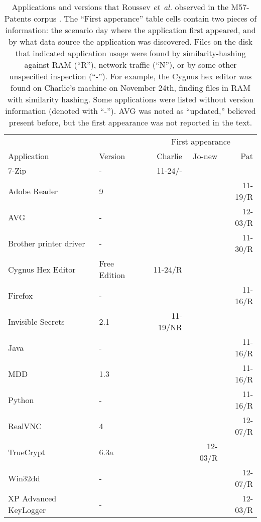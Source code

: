 \documentclass[11pt]{ucthesis}
\theoremstyle{plain}
\theoremstyle{definition}
\newcommand{\etal}{\emph{et~al.}\xspace}
\begin{document}
\begin{table}[htp]
\caption{\label{tbl:m57apps:roussev}Applications and versions that Roussev \etal observed in the M57-Patents corpus \cite[pages S67--S68]{roussev:dfrws12}.  The ``First apperance'' table cells contain two pieces of information: the scenario day where the application first appeared, and by what data source the application was discovered.  Files on the disk that indicated application usage were found by similarity-hashing against RAM (``R''), network traffic (``N''), or by some other unspecified inspection (``-'').  For example, the Cygnus hex editor was found on Charlie's machine on November 24th, finding files in RAM with similarity hashing.  Some applications were listed without version information (denoted with ``-'').  AVG was noted as ``updated,'' believed present before, but the first appearance was not reported in the text.}
\begin{center}
\begin{small}
\begin{tabular}{llrrr}
\toprule
 & & \multicolumn{3}{c}{First appearance} \\
Application & Version & Charlie & Jo-new & Pat \\
\midrule
7-Zip & - & 11-24/- & & \\
Adobe Reader & 9 & & & 11-19/R \\
AVG & - & & & 12-03/R \\
Brother printer driver & - & & & 11-30/R \\
Cygnus Hex Editor & Free Edition & 11-24/R & & \\
Firefox & - & & & 11-16/R \\
Invisible Secrets & 2.1 & 11-19/NR & & \\
Java & - & & & 11-16/R \\
MDD & 1.3 & & & 11-16/R \\
Python & - & & & 11-16/R \\
RealVNC & 4 & & & 12-07/R \\
TrueCrypt & 6.3a & & 12-03/R & \\
Win32dd & - & & & 12-07/R \\
XP Advanced KeyLogger & - & & & 12-03/R \\
\bottomrule
\end{tabular}
\end{small}
\end{center}
\end{table}%
\end{document}
